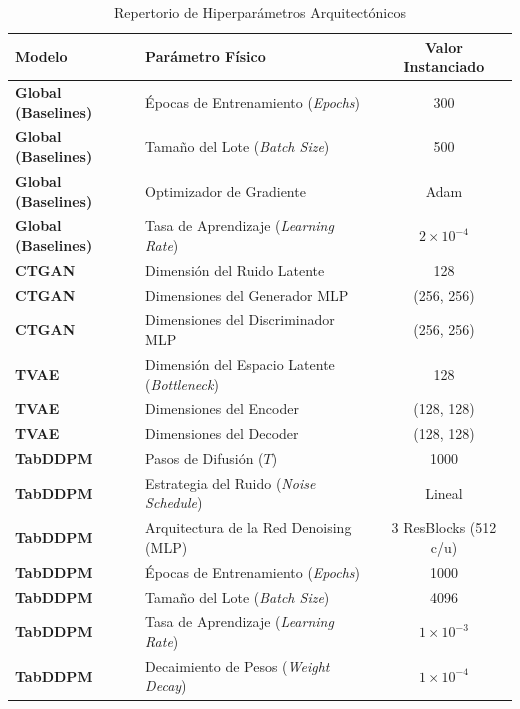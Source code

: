 \begin{table}[htbp]
\centering
\caption{Repertorio de Hiperparámetros Arquitectónicos}
\label{tab:hyperparameters}
\begin{tabularx}{\textwidth}{l >{\raggedright\arraybackslash}X c}
\toprule
\textbf{Modelo} & \textbf{Parámetro Físico} & \textbf{Valor Instanciado} \\
\midrule
\rowcolor{gray!15} \textbf{Global (Baselines)} & Épocas de Entrenamiento (\textit{Epochs}) & 300 \\
\textbf{Global (Baselines)} & Tamaño del Lote (\textit{Batch Size}) & 500 \\
\rowcolor{gray!15} \textbf{Global (Baselines)} & Optimizador de Gradiente & Adam \\
\textbf{Global (Baselines)} & Tasa de Aprendizaje (\textit{Learning Rate}) & $2 \times 10^{-4}$ \\
\midrule
\rowcolor{uaxblue!10} \textbf{CTGAN} & Dimensión del Ruido Latente & 128 \\
\textbf{CTGAN} & Dimensiones del Generador MLP & (256, 256) \\
\rowcolor{uaxblue!10} \textbf{CTGAN} & Dimensiones del Discriminador MLP & (256, 256) \\
\midrule
\rowcolor{gray!15} \textbf{TVAE} & Dimensión del Espacio Latente (\textit{Bottleneck}) & 128 \\
\textbf{TVAE} & Dimensiones del Encoder & (128, 128) \\
\rowcolor{gray!15} \textbf{TVAE} & Dimensiones del Decoder & (128, 128) \\
\midrule
\rowcolor{uaxblue!10} \textbf{TabDDPM} & Pasos de Difusión ($T$) & 1000 \\
\textbf{TabDDPM} & Estrategia del Ruido (\textit{Noise Schedule}) & Lineal \\
\rowcolor{uaxblue!10} \textbf{TabDDPM} & Arquitectura de la Red Denoising (MLP) & 3 ResBlocks (512 c/u) \\
\textbf{TabDDPM} & Épocas de Entrenamiento (\textit{Epochs}) & 1000 \\
\rowcolor{uaxblue!10} \textbf{TabDDPM} & Tamaño del Lote (\textit{Batch Size}) & 4096 \\
\textbf{TabDDPM} & Tasa de Aprendizaje (\textit{Learning Rate}) & $1 \times 10^{-3}$ \\
\rowcolor{uaxblue!10} \textbf{TabDDPM} & Decaimiento de Pesos (\textit{Weight Decay}) & $1 \times 10^{-4}$ \\
\bottomrule
\end{tabularx}
\end{table}

